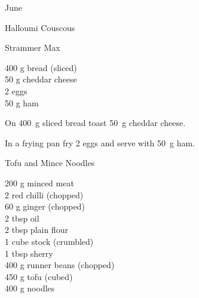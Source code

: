 \begin{menu}{June}
\begin{recipe}{2}{Halloumi Couscous}
\begin{instructions}
    \end{instructions}
    \end{recipe}%
  
    \begin{recipe}{1}{Strammer Max}%
		\begin{ingredients}
		400 g bread (sliced) \\
	50 g cheddar cheese  \\
	2  eggs  \\
	50 g ham  \\
	
		\end{ingredients}
	
	
    \begin{instructions}
    \item 
        On
        400~g sliced bread
        toast
        50~g  cheddar cheese.
      \item 
        In a frying pan fry
        2  eggs
        and serve with
        50~g  ham.
      
    \end{instructions}
    \end{recipe}%
  
    \begin{recipe}{2}{Tofu and Mince Noodles}%
		\begin{ingredients}
		200 g minced meat  \\
	2  red chilli (chopped) \\
	60 g ginger (chopped) \\
	2 tbsp oil  \\
	2 tbsp plain flour  \\
	1 cube stock (crumbled) \\
	1 tbsp sherry  \\
	400 g runner beans (chopped) \\
	450 g tofu (cubed) \\
	400 g noodles  \\
	
		\end{ingredients}
	
	

\end{recipe}
\end{menu}

